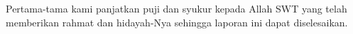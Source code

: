 \begin{acknowledgements}
Pertama-tama kami panjatkan puji dan syukur kepada Allah SWT yang telah memberikan rahmat dan hidayah-Nya sehingga laporan ini dapat diselesaikan.
\end{acknowledgements}